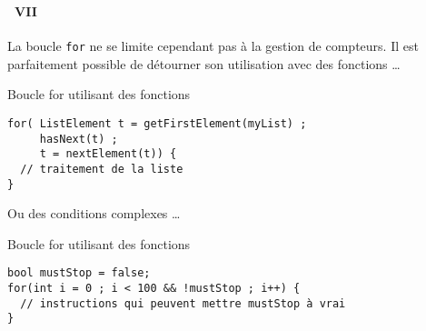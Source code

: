 \begin{frame}[containsverbatim]
  \frametitle{\secname}
  \framesubtitle{\subsecname~VII}

  La boucle \verb|for| ne se limite cependant pas à la gestion de compteurs. Il est parfaitement possible de détourner son utilisation avec des fonctions \ldots
  {\small\begin{exampleblock}{Boucle for utilisant des fonctions}
    \begin{verbatim}
for( ListElement t = getFirstElement(myList) ; 
     hasNext(t) ; 
     t = nextElement(t)) {
  // traitement de la liste
}\end{verbatim}
  \end{exampleblock}}
  Ou des conditions complexes \ldots
  {\small\begin{exampleblock}{Boucle for utilisant des fonctions}
    \begin{verbatim}
bool mustStop = false;
for(int i = 0 ; i < 100 && !mustStop ; i++) {
  // instructions qui peuvent mettre mustStop à vrai
}\end{verbatim}
  \end{exampleblock}}
\end{frame}

